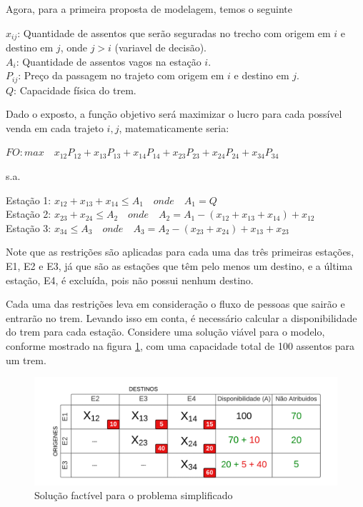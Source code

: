 Agora, para a primeira proposta de modelagem, temos o seguinte

\noindent $x_{ij}$: Quantidade de assentos que serão seguradas no trecho com origem em $i$ e destino em $j$, onde $j>i$ (variavel de decisão). \\
\noindent $A_i$: Quantidade de assentos vagos na estação $i$. \\
\noindent $P_{ij}$: Preço da passagem no trajeto com origem em $i$ e destino em $j$. \\
\noindent $Q$: Capacidade física do trem.

Dado o exposto, a função objetivo será maximizar o lucro para cada possível venda em cada trajeto $i,j$, matematicamente seria:

$FO: max \quad x_{12}P_{12} + x_{13}P_{13} + x_{14}P_{14} + x_{23}P_{23} + x_{24}P_{24} + x_{34}P_{34}$

s.a.

Estação 1: $x_{12} + x_{13} + x_{14} \leq A_1 \quad onde \quad A_1 = Q $ \\
\indent Estação 2: $x_{23} + x_{24}  \leq  A_2 \quad onde \quad A_2 = A_1 - (x_{12} + x_{13} + x_{14}) + x_{12} $ \\
\indent Estação 3: $x_{34} \leq A_3 \quad onde \quad A_3 = A_2 - (x_{23} + x_{24}) + x_{13} + x_{23} $

Note que as restrições são aplicadas para cada uma das três primeiras estações, E1, E2 e E3, já que são as estações que têm pelo menos um destino, e a última estação, E4, é excluída, pois não possui nenhum destino.

Cada uma das restrições leva em consideração o fluxo de pessoas que sairão e entrarão no trem. Levando isso em conta, é necessário calcular a disponibilidade do trem para cada estação. Considere uma solução viável para o modelo, conforme mostrado na figura \ref{fig: fig2}, com uma capacidade total de 100 assentos para um trem.

\begin{figure}[!ht]
	\begin{center}
		\includegraphics[scale=0.4]{img/fig2.png}
		\caption{Solução factível para o problema simplificado}
		\label{fig: fig2}
	\end{center}
\end{figure}

